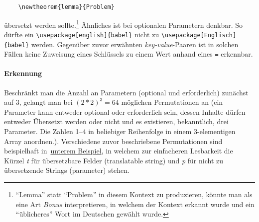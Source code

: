 \begin{Verbatim}
    \newtheorem{lemma}{Problem}
\end{Verbatim}
übersetzt werden sollte.\footnote{\enquote{Lemma} statt \enquote{Problem} in diesem Kontext zu produzieren, könnte man als eine Art \textit{Bonus} interpretieren, in welchem der Kontext erkannt wurde und ein \enquote{üblicheres} Wort im Deutschen gewählt wurde.}%
Ähnliches ist bei optionalen Parametern denkbar. So dürfte ein \verb"\usepackage[english]{babel}" nicht zu \verb"\usepackage[Englisch]{babel}" werden. Gegenüber zuvor erwähnten \textit{key-value}-Paaren ist in solchen Fällen keine Zuweisung eines Schlüssels zu einem Wert anhand eines \verb-=- erkennbar.


\paragraph{Erkennung}
Beschränkt man die Anzahl an Parametern (optional und erforderlich) zunächst auf 3, gelangt man bei ${(2*2)}^{3}=64$ möglichen Permutationen an (ein Parameter kann entweder optional oder erforderlich sein, dessen Inhalte dürfen entweder Übersetzt werden oder nicht und es existieren, bekanntlich, drei Parameter. Die Zahlen 1--4 in beliebiger Reihenfolge in einem 3-elementigen Array anordnen.). 
Verschiedene zuvor beschriebene Permutationen sind beispielhaft in~\hyperref[tab:problems:exampleParameter]{unterem Beispiel}, in welchem zur einfacheren Lesbarkeit die Kürzel \textit{t} für übersetzbare Felder (translatable string) und \textit{p} für nicht zu übersetzende Strings (parameter) stehen.


